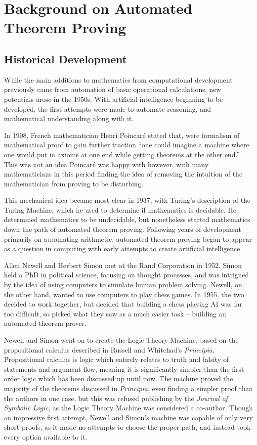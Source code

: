 \chapter{Background on Automated Theorem Proving}

\section{Historical Development}

While the main additions to mathematics from computational development previously came from automation of basic operational calculations, new potentials arose in the 1950s. With artificial intelligence beginning to be developed, the first attempts were made to automate reasoning, and mathematical understanding along with it.

In 1908, French mathematician Henri Poincar\'e stated that, were formalism of mathematical proof to gain further traction ``one could imagine a machine where one would put in axioms at one end while getting theorems at the other end.'' This was not an idea Poincar\'e was happy with however, with many mathematicians in this period finding the idea of removing the intuition of the mathematician from proving to be disturbing.

This mechanical idea became most clear in 1937, with Turing's description of the Turing Machine, which he used to determine if mathematics is decidable. He determined mathematics to be undecidable, but nonetheless started mathematics down the path of automated theorem proving. Following years of development primarily on automating arithmetic, automated theorem proving began to appear as a question in computing with early attempts to create artificial intelligence.

Allen Newell and Herbert Simon met at the Rand Corporation in 1952. Simon held a PhD in political science, focusing on thought processes, and was intrigued by the idea of using computers to simulate human problem solving. Newell, on the other hand, wanted to use computers to play chess games. In 1955, the two decided to work together, but decided that building a chess playing AI was far too difficult, so picked what they saw as a much easier task -- building an automated theorem prover.

Newell and Simon went on to create the Logic Theory Machine, based on the propositional calculus described in Russell and Whitehad's \textit{Principia}. Propositional calculus is logic which entirely relates to truth and falsity of statements and argument flow, meaning it is significantly simpler than the first order logic which has been discussed up until now. The machine proved the majority of the theorems discussed in \textit{Principia}, even finding a simpler proof than the authors in one case, but this was refused publishing by the \textit{Journal of Symbolic Logic}, as the Logic Theory Machine was considered a co-author. Though an impressive first attempt, Newell and Simon's machine was capable of only very short proofs, as it made no attempts to choose the proper path, and instead took every option available to it.

